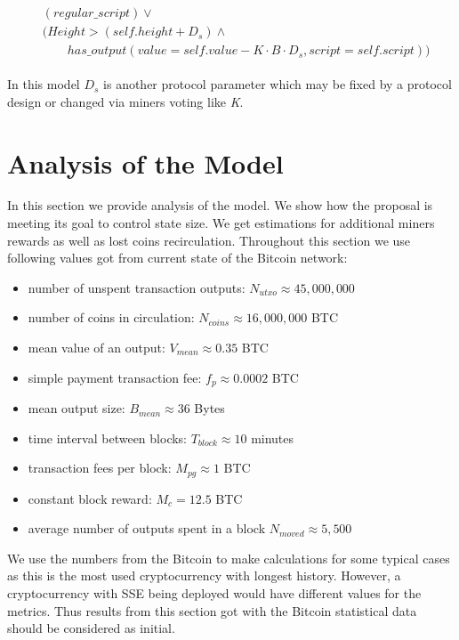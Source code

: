 \documentclass[]{llncs}   %
\newcommand{\authnote}[2]{\marginpar{\parbox{\marginparwidth}{\tiny %
  \textsf{#1 {\textcolor{blue}{notes: #2}}}}}%
  \textcolor{blue}{\textbf{\dag}}}
\newcommand{\authnote}[2]{
  \textsf{#1 \textcolor{blue}{: #2}}}
\newcommand{\authnote}[2]{}
\newcommand{\dnote}[1]{{\authnote{\textcolor{blue}{Dima notes}}{#1}}}
\begin{document}
\begin{align}
\begin{split}
&(regular\_script) \lor \\
&(Height > (self.height + D_s) \land \\  
&\qquad has\_output(value = self.value - K \cdot B \cdot D_s, script = self.script))
\end{split}
\end{align}

\dnote{With this script output is kept for free after $D_s$, if noone spent it.}

In this model $D_s$ is another protocol parameter which may be fixed by a protocol design or changed via miners voting like \textit{K}.

\section{Analysis of the Model}
\label{sec:analysis}

In this section we provide analysis of the model. We show how the proposal is meeting its goal to control state size. We get estimations for additional miners
rewards as well as lost coins recirculation. Throughout this section we use following values got from current state of the Bitcoin network:

\begin{itemize}
  \item number of unspent transaction outputs: $N_{utxo} \approx 45,000,000$
  \item number of coins in circulation: $N_{coins} \approx 16,000,000$ BTC
  \item mean value of an output: $V_{mean} \approx 0.35$ BTC
  \item simple payment transaction fee: $f_{p} \approx 0.0002$ BTC
  \item mean output size: $B_{mean} \approx 36$ Bytes
  \item time interval between blocks: $T_{block} \approx 10$ minutes
  \item transaction fees per block: $M_{pg} \approx 1$ BTC
  \item constant block reward: $M_c = 12.5$ BTC
  \item average number of outputs spent in a block $N_{moved} \approx 5,500$ 
\end{itemize}

We use the numbers from the Bitcoin to make calculations for some typical cases as this is the most used cryptocurrency with longest history. However, a cryptocurrency with SSE being deployed would have different values for the metrics. Thus results from this section got with the Bitcoin statistical data should be considered as initial.
\end{document}
